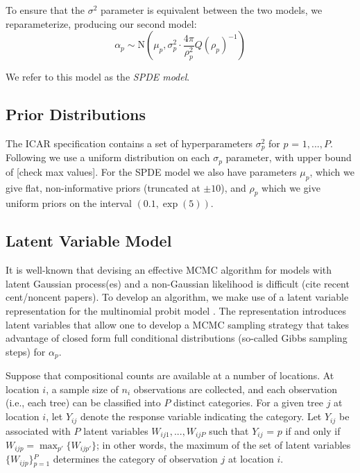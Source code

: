 \documentclass[12pt]{article}\usepackage[]{graphicx}\usepackage[]{color}
\begin{document}
To ensure that the $\sigma^{2}$ parameter is equivalent between the
two models, we reparameterize, producing our second model:
\[
\alpha_{p}\sim\mbox{N}(\mu_{p},\sigma_{p}^{2}\cdot\frac{4\pi}{\rho_{p}^{2}}Q(\rho_{p})^{-1})
\]


We refer to this model as the \emph{SPDE model}.


\subsection{Prior Distributions}

\noindent The ICAR specification contains a set of hyperparameters
$\sigma_{p}^{2}$ for $p$ = $1,...,P$. Following \citep{Gelm:2006}
we use a uniform distribution on each $\sigma_{p}$ parameter, with
upper bound of {[}check max values{]}. For the SPDE model we also
have parameters $\mu_{p}$, which we give flat, non-informative priors
(truncated at $\pm10$), and $\rho_{p}$ which we give uniform priors
on the interval $(0.1,\exp(5))$. 


\subsection{Latent Variable Model\label{sub:Latent-Variable-Model}}

It is well-known that devising an effective MCMC algorithm for models
with latent Gaussian process(es) and a non-Gaussian likelihood is
difficult (cite recent cent/noncent papers). To develop an algorithm,
we make use of a latent variable representation for the multinomial
probit model \citep{McCu:Ross:1994}. The representation introduces
latent variables that allow one to develop a MCMC sampling strategy
that takes advantage of closed form full conditional distributions
(so-called Gibbs sampling steps) for $\alpha_{p}$.

Suppose that compositional counts are available at a number of locations.
At location $i$, a sample size of $n_{i}$ observations are collected,
and each observation (i.e., each tree) can be classified into $P$
distinct categories. For a given tree $j$ at location $i$, let $Y_{ij}$
denote the response variable indicating the category. Let $Y_{ij}$
be associated with $P$ latent variables $W_{ij1},...,W_{ijP}$ such
that $Y_{ij}$ = $p$ if and only if $W_{ijp}={\displaystyle \max_{p'}\big\{ W_{ijp'}\big\}}$;
in other words, the maximum of the set of latent variables $\{W_{ijp}\}{\displaystyle _{p=1}^{P}}$
determines the category of observation $j$ at location $i$. 
\end{document}
